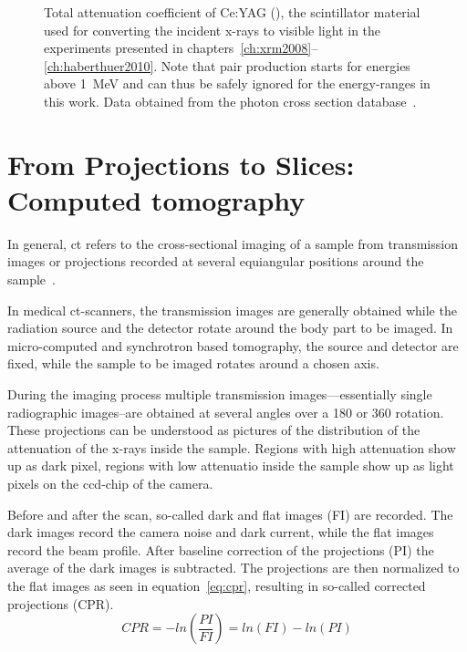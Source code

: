 \def\width{\linewidth}%
\def\height{0.618\linewidth}%
\begin{figure}[h]
		\centering
	\caption[Total attenuation coefficient of Ce:YAG]{Total attenuation coefficient of Ce:YAG (), the scintillator material used for converting the incident x-rays to visible light in the experiments presented in chapters~\ref{ch:xrm2008}--\ref{ch:haberthuer2010}. Note that pair production starts for energies above \SI{1}{\mega\electronvolt} and can thus be safely ignored for the energy-ranges in this work. Data obtained from the photon cross section database~\cite{XCOM}.}
	\label{fig:yag attenuation}
\end{figure}

\section{From Projections to Slices: Computed tomography}
In general, \ac{ct} refers to the cross-sectional imaging of a sample from transmission images or projections recorded at several equiangular positions around the sample~\cite{Kak2002}.

In medical \ac{ct}-scanners, the transmission images are generally obtained while the radiation source and the detector rotate around the body part to be imaged. In micro-computed and synchrotron based tomography, the source and detector are fixed, while the sample to be imaged rotates around a chosen axis.

During the imaging process multiple transmission images---essentially single radiographic images--are obtained at several angles over a \unit{180}{\degree} or \unit{360}{\degree} rotation. These projections can be understood as pictures of the distribution of the attenuation of the x-rays inside the sample. Regions with high attenuation show up as dark pixel, regions with low attenuatio inside the sample show up as light pixels on the \ac{ccd}-chip of the camera.

Before and after the scan, so-called dark and flat images (FI) are recorded. The dark images record the camera noise and dark current, while the flat images record the beam profile. After baseline correction of the projections (PI) the average of the dark images is subtracted. The projections are then normalized to the flat images as seen in equation~\ref{eq:cpr}, resulting in so-called corrected projections (CPR).%
\begin{equation}%
	CPR=-ln\left(\frac{PI}{FI}\right)=ln(FI)-ln(PI)%
	\label{eq:cpr}%
\end{equation}%

